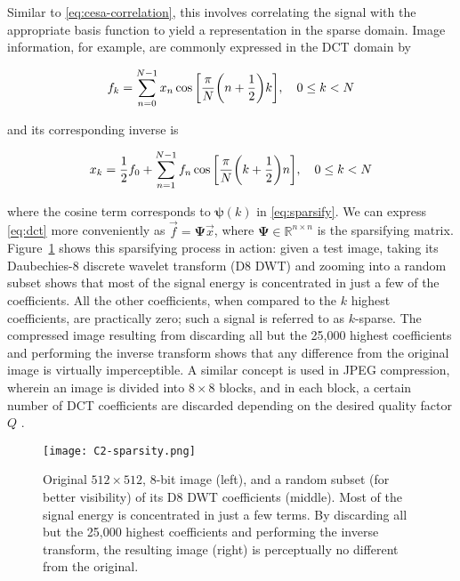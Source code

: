 Similar to \eqref{eq:cesa-correlation}, this involves correlating the signal with the appropriate basis function to yield a representation in the sparse domain. Image information, for example, are commonly expressed in the DCT domain by

\begin{equation}\label{eq:dct}
	f_k = \sum_{n=0}^{N-1} x_n \cos\qty[\frac{\pi}{N}\qty(n + \frac{1}{2})k] , \quad 0 \leq k < N
\end{equation}

\noindent and its corresponding inverse is

\begin{equation}\label{eq:idct}
	x_k = \frac{1}{2}f_0 + \sum_{n=1}^{N-1} f_n \cos\qty[\frac{\pi}{N} \qty(k + \frac{1}{2})n] , \quad 0 \leq k < N
\end{equation}

\noindent where the cosine term corresponds to $\bm\psi(k)$ in \eqref{eq:sparsify}. We can express \eqref{eq:dct} more conveniently as $\vec{f} = \bm\Psi \vec{x}$, where $\bm\Psi \in \mathbb{R}^{n \times n}$ is the sparsifying matrix. Figure~\ref{fig:sparsity} shows this sparsifying process in action: given a test image, taking its Daubechies-8 discrete wavelet transform (D8 DWT) and zooming into a random subset shows that most of the signal energy is concentrated in just a few of the coefficients. All the other coefficients, when compared to the $k$ highest coefficients, are practically zero; such a signal is referred to as $k$-sparse. The compressed image resulting from discarding all but the 25,000 highest coefficients and performing the inverse transform shows that any difference from the original image is virtually imperceptible. A similar concept is used in JPEG compression, wherein an image is divided into $8 \times 8$ blocks, and in each block, a certain number of DCT coefficients are discarded depending on the desired quality factor $Q$ \cite{itu-jpeg}.

\begin{figure}[htb]
	\texttt{[image: C2-sparsity.png]}
	\caption{Original $512 \times 512$, 8-bit image (left), and a random subset (for better visibility) of its D8 DWT coefficients (middle). Most of the signal energy is concentrated in just a few terms. By discarding all but the 25,000 highest coefficients and performing the inverse transform, the resulting image (right) is perceptually no different from the original.}
	\label{fig:sparsity}
\end{figure}


